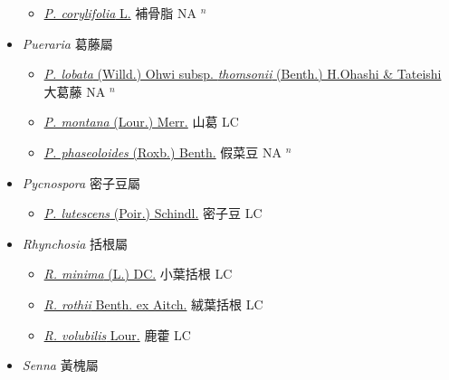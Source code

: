 \begin{itemize}
  \begin{itemize}
        \item[] \href{http://www.theplantlist.org/tpl1.1/search?q=Psoralea+corylifolia}{\textit{P. corylifolia} L.}   補骨脂 NA $^n$
  \end{itemize}
 \item[] \textit{Pueraria} 葛藤屬
                    
  \begin{itemize}
        \item[] \href{http://www.theplantlist.org/tpl1.1/search?q=Pueraria+lobata+subsp.+thomsonii}{\textit{P. lobata} (Willd.) Ohwi subsp. \textit{thomsonii} (Benth.) H.Ohashi \& Tateishi}   大葛藤 NA $^n$
        \item[] \href{http://www.theplantlist.org/tpl1.1/search?q=Pueraria+montana}{\textit{P. montana} (Lour.) Merr.}   山葛 LC
        \item[] \href{http://www.theplantlist.org/tpl1.1/search?q=Pueraria+phaseoloides}{\textit{P. phaseoloides} (Roxb.) Benth.}   假菜豆 NA $^n$
  \end{itemize}
 \item[] \textit{Pycnospora} 密子豆屬
                    
  \begin{itemize}
        \item[] \href{http://www.theplantlist.org/tpl1.1/search?q=Pycnospora+lutescens}{\textit{P. lutescens} (Poir.) Schindl.}   密子豆 LC
  \end{itemize}
 \item[] \textit{Rhynchosia} 括根屬
                    
  \begin{itemize}
        \item[] \href{http://www.theplantlist.org/tpl1.1/search?q=Rhynchosia+minima}{\textit{R. minima} (L.) DC.}     小葉括根 LC
        \item[] \href{http://www.theplantlist.org/tpl1.1/search?q=Rhynchosia+rothii}{\textit{R. rothii} Benth. ex Aitch.}   絨葉括根 LC
        \item[] \href{http://www.theplantlist.org/tpl1.1/search?q=Rhynchosia+volubilis}{\textit{R. volubilis} Lour.}   鹿藿 LC
  \end{itemize}
 \item[] \textit{Senna} 黃槐屬
                    

\end{itemize}

